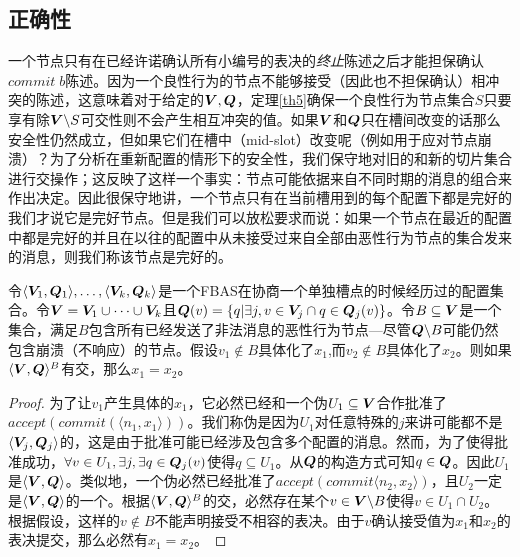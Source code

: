 \subsection{正确性}\label{sec:scp_correct}

一个节点只有在已经许诺确认所有小编号的表决的\textit{终止}陈述之后才能担保确认$commit\;b$陈述。因为一个良性行为的节点不能够接受（因此也不担保确认）相冲突的陈述，这意味着对于给定的${\bm V},{\bm Q}$，定理\ref{th5}确保一个良性行为节点集合$S$只要享有除${\bm V}\backslash S${\quorum}可交性则不会产生相互冲突的值。如果${\bm V}$和${\bm Q}$只在槽间改变的话那么安全性仍然成立，但如果它们在槽中（mid-slot）改变呢（例如用于应对节点崩溃）？为了分析在重新配置的情形下的安全性，我们保守地对旧的和新的{\quorum}切片集合进行交操作；这反映了这样一个事实：节点可能依据来自不同时期的消息的组合来作出决定。因此很保守地讲，一个节点只有在当前槽用到的每个配置下都是完好的我们才说它是完好节点。但是我们可以放松要求而说：如果一个节点在最近的配置中都是完好的并且在以往的配置中从未接受过来自全部由恶性行为节点的{\vblock}集合发来的消息，则我们称该节点是完好的。

\begin{theorem}\label{th12}
	令$\langle {\bm V_1},{\bm Q_1}\rangle,\ldots,\langle {\bm V_k},{\bm Q_k}\rangle$是一个FBAS在协商一个单独槽点的时候经历过的配置集合。令${\bm V}={\bm V_1}\cup \cdots\cup {\bm V_k}$且${\bm Q}(v)=\left\{q|\exists j, v\in{\bm V_j}\cap q\in{\bm Q}_j(v)\right\}$。令$B\subseteq{\bm V}$是一个集合，满足$B$包含所有已经发送了非法消息的恶性行为节点---尽管${\bm Q}\backslash B$可能仍然包含崩溃（不响应）的节点。假设$v_1\not\in B$具体化了$x_1$,而$v_2\not\in B$具体化了$x_2$。则如果$\langle{\bm V},{\bm Q}\rangle^{B}$有{\quorum}交，那么$x_1=x_2$。
\end{theorem}

\begin{proof}
	为了让$v_1$产生具体的$x_1$，它必然已经和一个伪{\quorum}$U_1\subseteq{\bm V}$合作批准了$accept(commit(\langle n_1,x_1\rangle))$。我们称伪{\quorum}是因为$U_1$对任意特殊的$j$来讲可能都不是$\langle{\bm V}_j,{\bm Q}_j\rangle$的{\quorum}，这是由于批准可能已经涉及包含多个配置的消息。然而，为了使得批准成功，$\forall v\in U_1,\exists j, \exists q\in{\bm Q}_j(v)$使得$q\subseteq U_1$。从${\bm Q}$的构造方式可知$q\in{\bm Q}$。因此$U_1$是$\langle{\bm V},{\bm Q}\rangle$。类似地，一个伪{\quorum}必然已经批准了$accept(commit\langle n_2,x_2\rangle)$，且$U_2$一定是$\langle{\bm V},{\bm Q}\rangle$的一个{\quorum}。根据$\langle{\bm V},{\bm Q}\rangle^{B}$的{\quorum}交，必然存在某个$v\in {\bm V}\backslash B$使得$v\in U_1\cap U_2$。根据假设，这样的$v\not\in B$不能声明接受不相容的表决。由于$v$确认接受值为$x_1$和$x_2$的表决提交，那么必然有$x_1=x_2$。
\end{proof}

